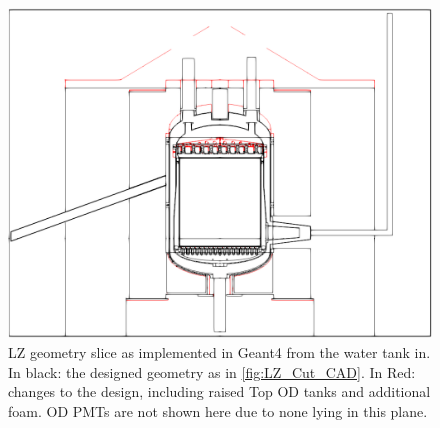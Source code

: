 \begin{figure}[]
\includegraphics[width=\textwidth]{Figures/Geometry/geometry_differences_black_and_white.png}
\centering
\caption{LZ geometry slice as implemented in Geant4 from the water tank in. In black: the designed geometry as in \autoref{fig:LZ_Cut_CAD}. In Red: changes to the design, including raised Top OD tanks and additional foam. OD PMTs are not shown here due to none lying in this plane.}
\label{fig:Geometry_Differences}
\end{figure}

